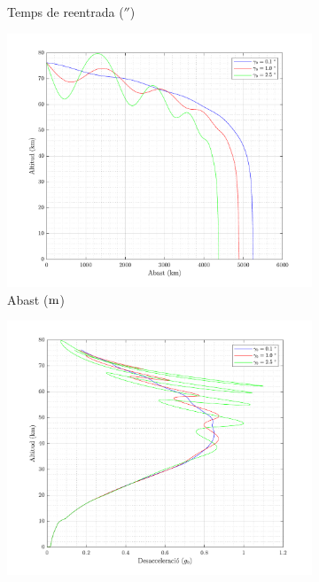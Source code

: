 \begin{figure}[ht]
\begin{subfigure}[t]{.33\textwidth}
        \caption{Temps de reentrada ($\second$)}
    \end{subfigure}%
    \begin{subfigure}[t]{.33\textwidth}
        \centering
        \includegraphics[width=\linewidth]{imagenes/02_lifting_graficas/abast_no_title.pdf}
        \caption{Abast ($\meter$)}
    \end{subfigure}
        \begin{subfigure}[t]{.33\textwidth}
        \centering
        \includegraphics[width=\linewidth]{imagenes/02_lifting_graficas/desacceleracio_no_title.pdf}

\end{subfigure}
\end{figure}
